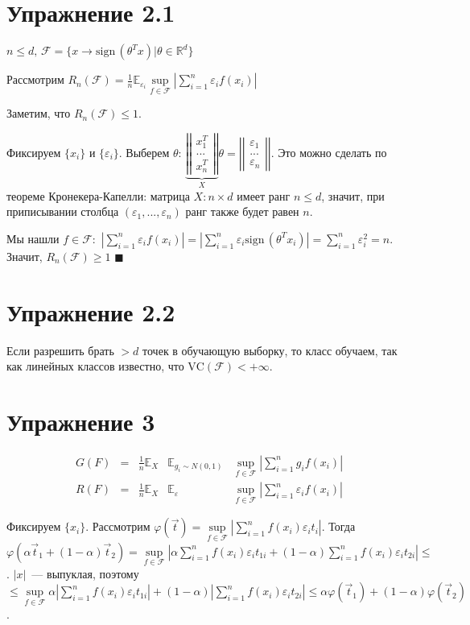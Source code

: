 \documentclass[a4paper]{article}
\newcommand{\matrixl}{\left|\left|}
\newcommand{\matrixr}{\right|\right|}
\newcommand{\VC}{\mbox{VC}}
\newcommand{\sign}{\mbox{sign}\,}
\newcommand{\F}{\mathcal{F}}
\newcommand{\R}{\mathbb{R}}
\newcommand{\E}{\mathbb{E}}
\def\eps{\varepsilon}
\begin{document}
\section*{Упражнение 2.1}
$n\leqslant d,\,\mathcal{F}=\{x\to \sign(\theta^Tx)\big| \theta\in\R^d\}$

Рассмотрим $R_n(\F)=\frac{1}{n}\mathbb{E}_{\eps_i}\sup\limits_{f\in\F}|\sum\limits_{i=1}^n \eps_i f(x_i)|$

Заметим, что $\boxed{R_n(\F)\leqslant 1}$.

Фиксируем $\{x_i\}$ и $\{\eps_i\}$. Выберем $\theta$: $\underbrace{\matrixl\begin{array}{c}
x_1^T\\
...\\
x_n^T
\end{array}\matrixr}_X\theta=\matrixl\begin{array}{c}
\eps_1\\
...\\
\eps_n
\end{array}
\matrixr$. Это можно сделать по теореме Кронекера-Капелли: матрица $X\colon n\times d$ имеет ранг $n\leqslant d$, значит, при приписывании столбца $(\eps_1,...,\eps_n)$ ранг также будет равен $n$.

Мы нашли $f\in\F\colon $ $|\sum\limits_{i=1}^n \eps_i f(x_i)|=|\sum\limits_{i=1}^n \eps_i \sign(\theta^Tx_i)|=\sum\limits_{i=1}^n \eps_i^2=n$. Значит, $\boxed{R_n(\F)\geqslant 1}$ $\blacksquare$
\section*{Упражнение 2.2}
Если разрешить брать $>d$ точек в обучающую выборку, то класс обучаем, так как линейных классов известно, что $\VC(\F)<+\infty$.
\section*{Упражнение 3}
$$
\begin{array}{ccccc}
G(F)&=&\frac{1}{n}\E_X&\E_{g_i\sim N(0,1)}&\sup\limits_{f\in \F}|\sum\limits_{i=1}^n g_if(x_i)|\\
R(F)&=&\frac{1}{n}\E_X&\E_{\eps}&\sup\limits_{f\in \F}|\sum\limits_{i=1}^n \eps_if(x_i)|
\end{array}$$

Фиксируем $\{x_i\}$. Рассмотрим $\varphi(\vec{t})=\sup\limits_{f\in\F}|\sum\limits_{i=1}^n f(x_i)\eps_i t_i|$. Тогда $\varphi(\alpha\vec{t}_1+(1-\alpha)\vec{t}_2)=\sup\limits_{f\in\F}|\alpha\sum\limits_{i=1}^n f(x_i)\eps_i t_{1i}+(1-\alpha)\sum\limits_{i=1}^n f(x_i)\eps_i t_{2i}|\boxed{\leqslant}$. $|x|$~--- выпуклая, поэтому $\boxed{\leqslant}\sup\limits_{f\in\F}\alpha|\sum\limits_{i=1}^n f(x_i)\eps_i t_{1i}|+(1-\alpha)|\sum\limits_{i=1}^n f(x_i)\eps_i t_{2i}|\leqslant \alpha\varphi(\vec{t}_1)+(1-\alpha)\varphi(\vec{t}_2)$.
\end{document}
